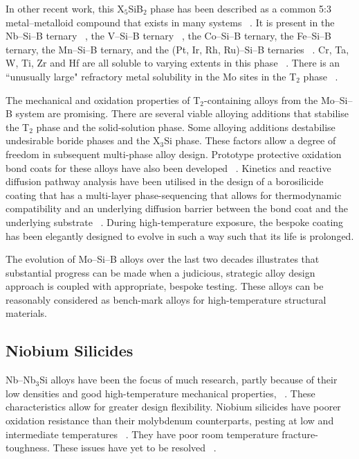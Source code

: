 In other recent work, this X$_5$SiB$_2$ phase has been described as a common 5:3 metal--metalloid compound that exists in many systems ~\cite{sakidja08}.  It is present in the Nb--Si--B ternary ~\cite{nunes97}, the V--Si--B ternary ~\cite{rodrigues09}, the Co--Si--B ternary, the Fe--Si--B ternary, the Mn--Si--B ternary, and the (Pt, Ir, Rh, Ru)--Si--B  ternaries ~\cite{sakidja08}.  Cr, Ta, W, Ti, Zr and Hf are all soluble to varying extents in this phase ~\cite{perepezko01, sakidja00, sakidja05, sakidja08}.  There is an ``unusually large"  refractory metal solubility in the Mo sites in the T$_2$ phase ~\cite{sakidja08}.

The mechanical and oxidation properties of T$_2$-containing alloys from the Mo--Si--B system are promising.  There are several viable alloying additions that stabilise the T$_2$ phase and the solid-solution phase.  Some alloying additions destabilise undesirable boride phases and the X$_3$Si phase.  These factors allow a degree of freedom in subsequent multi-phase alloy design.  Prototype protective oxidation bond coats for these alloys have also been developed ~\cite{perepezko10}.  Kinetics and reactive diffusion pathway analysis have been utilised in the design of a borosilicide coating that has a multi-layer phase-sequencing that allows for thermodynamic compatibility and an underlying diffusion barrier between the bond coat and the underlying substrate ~\cite{perepezko10}.  During high-temperature exposure, the bespoke coating has been elegantly designed to evolve in such a way such that its life is prolonged.

The evolution of Mo--Si--B alloys over the last two decades illustrates that substantial progress can be made when a judicious, strategic alloy design approach is coupled with appropriate, bespoke testing.  These alloys can be reasonably considered as bench-mark alloys for high-temperature structural materials.



\subsection{Niobium Silicides}

Nb--Nb$_3$Si alloys have been the focus of much research, partly because of their low densities and good high-temperature mechanical properties, ~\cite{jackson96, fleischer87, fleischer94, sauthoff88, shah92, bewlay03, miura09, balsone01}.  These characteristics allow for greater design flexibility.  Niobium silicides have poorer oxidation resistance than their molybdenum counterparts, pesting at low and intermediate temperatures ~\cite{ramberg93}.  They have poor room temperature fracture-toughness.  These issues have yet to be resolved ~\cite{jackson96, fleischer87, fleischer94, sauthoff88, shah92, ramberg93, bewlay03, mitra06}.

